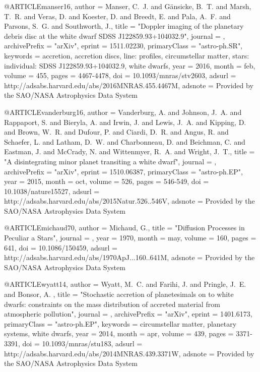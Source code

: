 \documentclass[a4paper,fleqn,usenatbib]{mnras}
\begin{document}
{{{{{{@ARTICLE{manser16,
   author = {{Manser}, C.~J. and {G{\"a}nsicke}, B.~T. and {Marsh}, T.~R. and 
	{Veras}, D. and {Koester}, D. and {Breedt}, E. and {Pala}, A.~F. and 
	{Parsons}, S.~G. and {Southworth}, J.},
    title = "{Doppler imaging of the planetary debris disc at the white dwarf SDSS J122859.93+104032.9}",
  journal = {\mnras},
archivePrefix = "arXiv",
   eprint = {1511.02230},
 primaryClass = "astro-ph.SR",
 keywords = {accretion, accretion discs, line: profiles, circumstellar matter, stars: individual: SDSS J122859.93+104032.9, white dwarfs},
     year = 2016,
    month = feb,
   volume = 455,
    pages = {4467-4478},
      doi = {10.1093/mnras/stv2603},
   adsurl = {http://adsabs.harvard.edu/abs/2016MNRAS.455.4467M},
  adsnote = {Provided by the SAO/NASA Astrophysics Data System}
}


@ARTICLE{vanderburg16,
   author = {{Vanderburg}, A. and {Johnson}, J.~A. and {Rappaport}, S. and 
	{Bieryla}, A. and {Irwin}, J. and {Lewis}, J.~A. and {Kipping}, D. and 
	{Brown}, W.~R. and {Dufour}, P. and {Ciardi}, D.~R. and {Angus}, R. and 
	{Schaefer}, L. and {Latham}, D.~W. and {Charbonneau}, D. and 
	{Beichman}, C. and {Eastman}, J. and {McCrady}, N. and {Wittenmyer}, R.~A. and 
	{Wright}, J.~T.},
    title = "{A disintegrating minor planet transiting a white dwarf}",
  journal = {\nat},
archivePrefix = "arXiv",
   eprint = {1510.06387},
 primaryClass = "astro-ph.EP",
     year = 2015,
    month = oct,
   volume = 526,
    pages = {546-549},
      doi = {10.1038/nature15527},
   adsurl = {http://adsabs.harvard.edu/abs/2015Natur.526..546V},
  adsnote = {Provided by the SAO/NASA Astrophysics Data System}
}

@ARTICLE{michaud70,
   author = {{Michaud}, G.},
    title = "{Diffusion Processes in Peculiar a Stars}",
  journal = {\apj},
     year = 1970,
    month = may,
   volume = 160,
    pages = {641},
      doi = {10.1086/150459},
   adsurl = {http://adsabs.harvard.edu/abs/1970ApJ...160..641M},
  adsnote = {Provided by the SAO/NASA Astrophysics Data System}
}

@ARTICLE{wyatt14,
   author = {{Wyatt}, M.~C. and {Farihi}, J. and {Pringle}, J.~E. and {Bonsor}, A.
	},
    title = "{Stochastic accretion of planetesimals on to white dwarfs: constraints on the mass distribution of accreted material from atmospheric pollution}",
  journal = {\mnras},
archivePrefix = "arXiv",
   eprint = {1401.6173},
 primaryClass = "astro-ph.EP",
 keywords = {circumstellar matter, planetary systems, white dwarfs},
     year = 2014,
    month = apr,
   volume = 439,
    pages = {3371-3391},
      doi = {10.1093/mnras/stu183},
   adsurl = {http://adsabs.harvard.edu/abs/2014MNRAS.439.3371W},
  adsnote = {Provided by the SAO/NASA Astrophysics Data System}
}

}}}}}}
\end{document}
